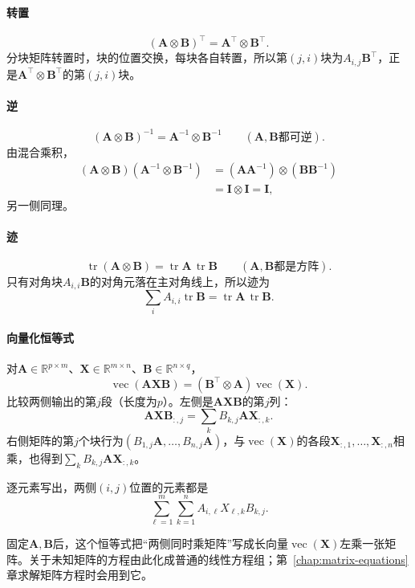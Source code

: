 \paragraph{转置}
\[
 (\bm A\otimes\bm B)^\top=\bm A^\top\otimes\bm B^\top.
\]
分块矩阵转置时，块的位置交换，每块各自转置，所以第$(j,i)$块为$A_{i,j}\bm B^\top$，正是$\bm A^\top\otimes\bm B^\top$的第$(j,i)$块。

\paragraph{逆}
\[
 (\bm A\otimes\bm B)^{-1}=\bm A^{-1}\otimes\bm B^{-1}\qquad(\bm A,\bm B\text{都可逆}).
\]
由混合乘积，
\[
 \begin{aligned}
 (\bm A\otimes\bm B)(\bm A^{-1}\otimes\bm B^{-1})
 &=(\bm A\bm A^{-1})\otimes(\bm B\bm B^{-1})\\
 &=\bm I\otimes\bm I=\bm I,
 \end{aligned}
\]
另一侧同理。

\paragraph{迹}
\[
 \operatorname{tr}(\bm A\otimes\bm B)=\operatorname{tr}\bm A\,\operatorname{tr}\bm B\qquad(\bm A,\bm B\text{都是方阵}).
\]
只有对角块$A_{i,i}\bm B$的对角元落在主对角线上，所以迹为
\[
 \sum_iA_{i,i}\operatorname{tr}\bm B=\operatorname{tr}\bm A\,\operatorname{tr}\bm B.
\]

\paragraph{向量化恒等式}
对$\bm A\in\mathbb R^{p\times m}$、$\bm X\in\mathbb R^{m\times n}$、$\bm B\in\mathbb R^{n\times q}$，
\begin{equation}
 \operatorname{vec}(\bm A\bm X\bm B)
 =(\bm B^\top\otimes\bm A)\operatorname{vec}(\bm X).
 \label{eq:matrix-analysis-vec-kronecker}
\end{equation}
比较两侧输出的第$j$段（长度为$p$）。左侧是$\bm A\bm X\bm B$的第$j$列：
\[
 \bm A\bm X\bm B_{:,j}=\sum_kB_{k,j}\bm A\bm X_{:,k}.
\]
右侧矩阵的第$j$个块行为$(B_{1,j}\bm A,\ldots,B_{n,j}\bm A)$，与$\operatorname{vec}(\bm X)$的各段$\bm X_{:,1},\ldots,\bm X_{:,n}$相乘，也得到$\sum_kB_{k,j}\bm A\bm X_{:,k}$。

逐元素写出，两侧$(i,j)$位置的元素都是
\[
 \sum_{\ell=1}^m\sum_{k=1}^n A_{i,\ell}X_{\ell,k}B_{k,j}.
\]

固定$\bm A,\bm B$后，这个恒等式把“两侧同时乘矩阵”写成长向量$\operatorname{vec}(\bm X)$左乘一张矩阵。关于未知矩阵的方程由此化成普通的线性方程组；第~\ref{chap:matrix-equations}章求解矩阵方程时会用到它。

